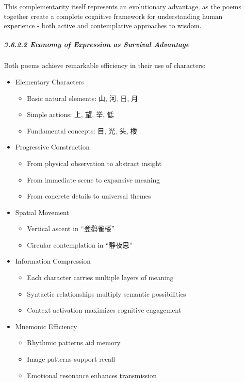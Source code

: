 \documentclass[
  11pt,
  letterpaper,
]{article}
\providecommand{\tightlist}{%
  \setlength{\itemsep}{0pt}\setlength{\parskip}{0pt}}
\begin{document}
This complementarity itself represents an evolutionary advantage, as the
poems together create a complete cognitive framework for understanding
human experience - both active and contemplative approaches to wisdom.

\hypertarget{economy-of-expression-as-survival-advantage}{%
\subparagraph{3.6.2.2 Economy of Expression as Survival
Advantage}\label{economy-of-expression-as-survival-advantage}}

Both poems achieve remarkable efficiency in their use of characters:

\begin{itemize}
\tightlist
\item
  Elementary Characters

  \begin{itemize}
  \tightlist
  \item
    Basic natural elements: 山, 河, 日, 月
  \item
    Simple actions: 上, 望, 举, 低
  \item
    Fundamental concepts: 目, 光, 头, 楼
  \end{itemize}
\item
  Progressive Construction

  \begin{itemize}
  \tightlist
  \item
    From physical observation to abstract insight
  \item
    From immediate scene to expansive meaning
  \item
    From concrete details to universal themes
  \end{itemize}
\item
  Spatial Movement

  \begin{itemize}
  \tightlist
  \item
    Vertical ascent in ``登鹳雀楼''
  \item
    Circular contemplation in ``静夜思''
  \end{itemize}
\item
  Information Compression

  \begin{itemize}
  \tightlist
  \item
    Each character carries multiple layers of meaning
  \item
    Syntactic relationships multiply semantic possibilities
  \item
    Context activation maximizes cognitive engagement
  \end{itemize}
\item
  Mnemonic Efficiency

  \begin{itemize}
  \tightlist
  \item
    Rhythmic patterns aid memory
  \item
    Image patterns support recall
  \item
    Emotional resonance enhances transmission
  \end{itemize}
\end{itemize}
\end{document}
